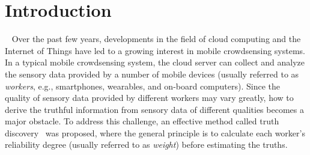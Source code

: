\documentclass[conference]{IEEEtran}
\begin{document}
\section{Introduction}~\label{sec1}
Over the past few years, developments in the field of cloud computing and the Internet of Things have led to a growing interest in mobile crowdsensing systems.
In a typical mobile crowdsensing system, the cloud server can collect and analyze the sensory data provided by a number of mobile devices (usually referred to as {\em workers}, e.g., smartphones, wearables, and on-board computers).
Since the quality of sensory data provided by different workers may vary greatly, how to derive the truthful information from sensory data of different qualities becomes a major obstacle.
To address this challenge, an effective method called truth discovery~\cite{li_resolving_2014,li_confidence-aware_2014,li_conflicts_2016} was proposed, where the general principle is to calculate each worker's reliability degree (usually referred to as {\em weight}) before estimating the truths.
\end{document}
